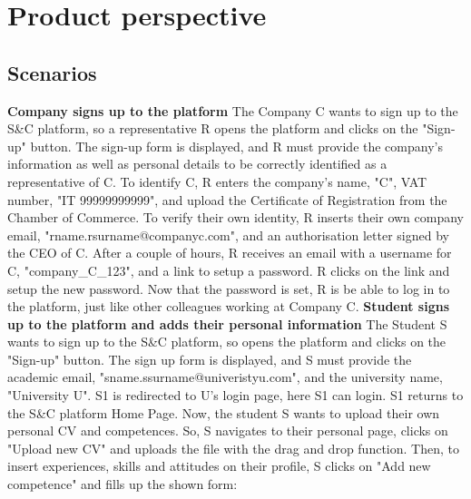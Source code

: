\section{Product perspective}
\subsection{Scenarios}
\textbf{Company signs up to the platform}\newline
The Company C wants to sign up to the S\&C platform, so a representative R opens the platform and clicks on the "Sign-up" button. The sign-up form is displayed, and R must provide the company's information as well as personal details to be correctly identified as a representative of C. To identify C, R enters the company's name, "C", VAT number, "IT 99999999999", and upload the Certificate of Registration from the Chamber of Commerce. To verify their own identity, R inserts their own company email, "rname.rsurname@companyc.com", and an authorisation letter signed by the CEO of C. 
After a couple of hours, R receives an email with a username for C, "company\_C\_123", and a link to setup a password. R clicks on the link and setup the new password. Now that the password is set, R is be able to log in to the platform, just like other colleagues working at Company C.
\newline\newline
\textbf{Student signs up to the platform and adds their personal information}
\newline
The Student S wants to sign up to the S\&C platform, so opens the platform and clicks on the "Sign-up" button. The sign up form is displayed, and S must provide the academic email, "sname.ssurname@univeristyu.com", and the university name, "University U". S1 is redirected to U's login page, here S1 can login. S1 returns to the S\&C platform Home Page. Now, the student S wants to upload their own personal CV and competences. So, S navigates to their personal page, clicks on "Upload new CV" and uploads the file with the drag and drop function. Then, to insert experiences, skills and attitudes on their profile, S clicks on 
"Add new competence" and fills up the shown form:
